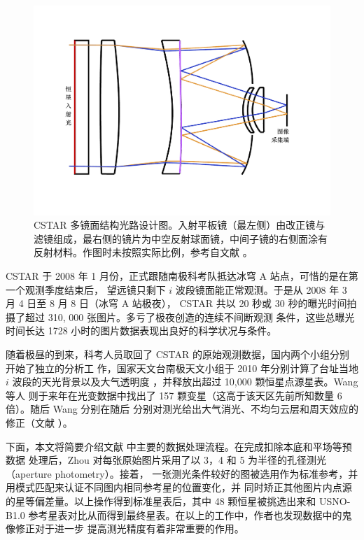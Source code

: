 \begin{figure}[t]
\centering
\includegraphics[width=1.0\textwidth]{figures/chapter2/f2_cstaroptics.pdf}
\caption[CSTAR 多镜面结构光路设计图。入射平板镜（最左侧）由改正镜与滤镜组成，最右侧的镜片为中空反射球面镜，中间子镜的右侧面涂有反射材料，该图与实际大小不成比例。]{CSTAR 多镜面结构光路设计图。入射平板镜（最左侧）由改正镜与滤镜组成，最右侧的镜片为中空反射球面镜，中间子镜的右侧面涂有反射材料。作图时未按照实际比例，参考自文献 。}
\label{fig:cstaroptics}
\end{figure}

CSTAR 于 2008 年 1 月份，正式跟随南极科考队抵达冰穹 A 站点，可惜的是在第一个观测季度结束后，
望远镜只剩下 $i$ 波段镜面能正常观测。于是从 2008 年 3 月 4 日至 8 月 8 日（冰穹 A 站极夜），
CSTAR 共以 20 秒或 30 秒的曝光时间拍摄了超过 310, 000 张图片。多亏了极夜创造的连续不间断观测
条件，这些总曝光时间长达 1728 小时的图片数据表现出良好的科学状况与条件。

随着极昼的到来，科考人员取回了 CSTAR 的原始观测数据，国内两个小组分别开始了独立的分析工
作，国家天文台南极天文小组于 2010 年分别计算了台址当地 $i$ 波段的天光背景以及大气透明度
\cite{Zou2010}，并释放出超过 10,000 颗恒星点源星表\cite{ZhouX2010b}。Wang 等人\cite{Wang2011}
则于来年在光变数据中找出了 157 颗变星（这高于该天区先前所知数量 6 倍）。随后 Wang 分别在随后
分别对测光给出大气消光、不均匀云层和周天效应的修正（文献 ）。

下面，本文将简要介绍文献  中主要的数据处理流程。在完成扣除本底和平场等预数据
处理后，Zhou 对每张原始图片采用了以 3，4 和 5 为半径的孔径测光（aperture photometry）。接着，
一张测光条件较好的图被选用作为标准参考，并用模式匹配来认证不同图内相同参考星的位置变化，并
同时矫正其他图片内点源的星等偏差量。以上操作得到标准星表后，其中 48 颗恒星被挑选出来和 
USNO-B1.0 参考星表对比从而得到最终星表。在以上的工作中，作者也发现数据中的鬼像修正对于进一步
提高测光精度有着非常重要的作用。

